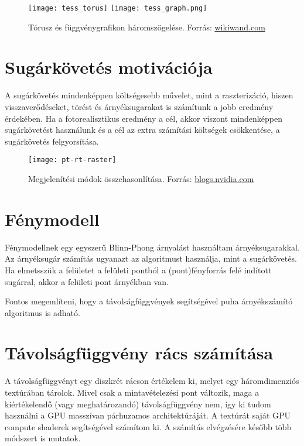 \begin{figure}[H]
	\centering
	\texttt{[image: tess\_torus]}
	\hspace{5pt}
	\texttt{[image: tess\_graph.png]}
	\caption{Tórusz és függvénygrafikon háromszögelése. Forrás: \href{https://www.wikiwand.com/en/Surface_triangulation}{wikiwand.com}}
\end{figure}


\section{Sugárkövetés motivációja}

A sugárkövetés mindenképpen költségesebb művelet, mint a raszterizáció, hiszen visszaverődéseket, törést és árnyéksugarakat is számítunk a jobb eredmény érdekében. Ha a fotorealisztikus eredmény a cél, akkor viszont mindenképpen sugárkövetést használunk és a cél az extra számítási költségek csökkentése, a sugárkövetés felgyorsítása. 

\begin{figure}[H]
	\centering
	\texttt{[image: pt-rt-raster]}
	\caption{Megjelenítési módok összehasonlítása. Forrás: \href{https://blogs.nvidia.com/blog/2022/03/23/what-is-path-tracing/}{blogs.nvidia.com}}
\end{figure}


\section{Fénymodell}

Fénymodellnek egy egyszerű Blinn-Phong árnyalást használtam \cite{Blinn1977} árnyéksugarakkal. Az árnyéksugár számítás ugyanazt az algoritmust használja, mint a sugárkövetés. Ha elmetsszük a felületet a felületi pontból a (pont)fényforrás felé indított sugárral, akkor a felületi pont árnyékban van.

Fontos megemlíteni, hogy a távolságfüggvények segítségével puha árnyékszámító algoritmus is adható. \cite{AreaLights}


\section{Távolságfüggvény rács számítása}

A távolságfüggvényt egy diszkrét rácson értékelem ki, melyet egy háromdimenziós textúrában tárolok. Mivel csak a mintavételezési pont változik, maga a kiértékelendő (vagy meghatározandó) távolságfüggvény nem, így ki tudom használni a GPU masszívan párhuzamos architektúráját. A textúrát saját GPU compute shaderek segítségével számítom ki. A számítás elvégzésére később több módszert is mutatok. 

